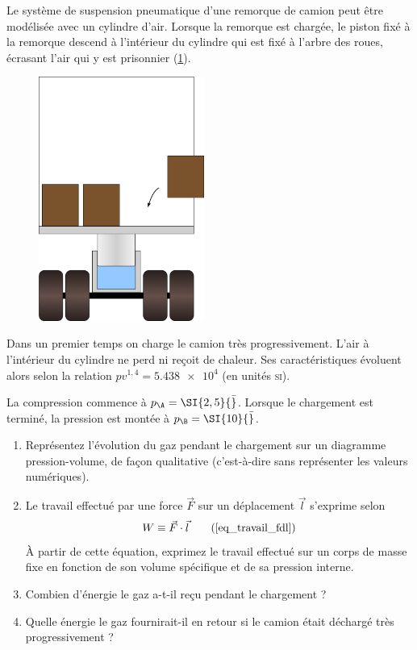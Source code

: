 	Le système de suspension pneumatique d’une remorque de camion peut être modélisée avec un cylindre d’air. Lorsque la remorque est chargée, le piston fixé à la remorque descend à l’intérieur du cylindre qui est fixé à l’arbre des roues, écrasant l’air qui y est prisonnier (\cref{fig_camion}).

	\begin{figure}
	\begin{center}
		\includegraphics[height=8cm]{images/piston_camion.png}
	\end{center}
	\label{fig_camion}
	\end{figure}
	
	Dans un premier temps on charge le camion très progressivement. L’air à l’intérieur du cylindre ne perd ni reçoit de chaleur. Ses caractéristiques évoluent alors selon la relation $p v^{1,4} = \num{5,438e4}$ (en unités \textsc{si}).
	
	La compression commence à $p_\A = \SI{2,5}{\bar}$. Lorsque le chargement est terminé, la pression est montée à $p_\B = \SI{10}{\bar}$.
	
	\begin{enumerate}
		\item Représentez l’évolution du gaz pendant le chargement sur un diagramme pression-volume, de façon qualitative (c’est-à-dire sans représenter les valeurs numériques).
		\item Le travail effectué par une force $\vec F$ sur un déplacement $\vec l$ s’exprime selon
			\begin{equation}
				W \equiv \vec F \cdot \vec l 	\tag{\ref{eq_travail_fdl}}
			\end{equation}
			À partir de cette équation, exprimez le travail effectué sur un corps de masse fixe en fonction de son volume spécifique et de sa pression interne.
		\item Combien d’énergie le gaz a-t-il reçu pendant le chargement ?
		\item Quelle énergie le gaz fournirait-il en retour si le camion était déchargé très progressivement ?
	\end{enumerate}
	
